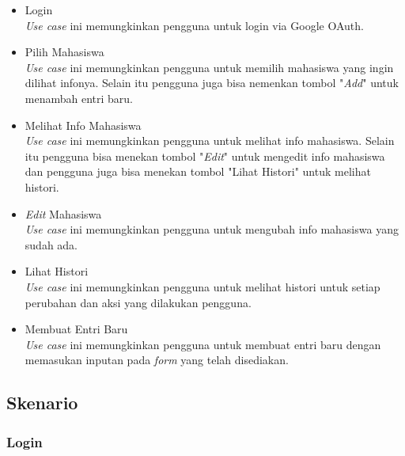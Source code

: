 \begin{itemize}
\item Login\\
{\it Use case} ini memungkinkan pengguna untuk login via Google OAuth.
\item Pilih Mahasiswa\\
{\it Use case} ini memungkinkan pengguna untuk memilih mahasiswa yang ingin dilihat
infonya. Selain itu pengguna juga bisa nemenkan tombol "{\it Add}" untuk
menambah entri baru.
\item Melihat Info Mahasiswa\\
{\it Use case} ini memungkinkan pengguna untuk melihat info mahasiswa. Selain itu
pengguna bisa menekan tombol "{\it Edit}" untuk mengedit info mahasiswa dan
pengguna juga bisa menekan tombol "Lihat Histori" untuk melihat histori.
\item {\it Edit} Mahasiswa\\
{\it Use case} ini memungkinkan pengguna untuk mengubah info mahasiswa yang
sudah ada.
\item Lihat Histori\\
{\it Use case} ini memungkinkan pengguna untuk melihat histori untuk setiap perubahan
dan aksi yang dilakukan pengguna.
\item Membuat Entri Baru\\
{\it Use case} ini memungkinkan pengguna untuk membuat entri baru dengan memasukan
inputan pada {\it form} yang telah disediakan.
\end{itemize}

\subsection{Skenario}
\subsubsection{Login}

